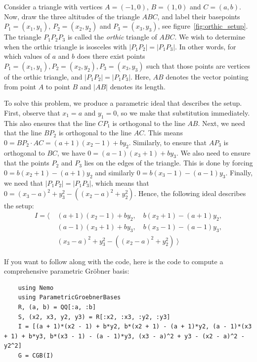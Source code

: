 \begin{example}\label{ex:quant_elim}\upshape
  Consider a triangle with vertices $A = (-1, 0)$, $B = (1, 0)$ and $C = (a, b)$. Now, draw the three altitudes of the triangle $ABC$, and label their basepoints $P_{1} = (x_{1}, y_{1})$, $P_{2} = (x_{2}, y_{2})$ and $P_{3} = (x_{3}, y_{3})$, see figure~\ref{fig:orthic_setup}. The triangle $P_{1}P_{2}P_{3}$ is called the \textit{orthic} triangle of $ABC$. We wish to determine when the orthic triangle is isosceles with $|P_{1}P_{2}| = |P_{1}P_{3}|$. In other words, for which values of $a$ and $b$ does there exist points $P_{1} = (x_{1}, y_{1}), P_{2} = (x_{2}, y_{2}), P_{3} = (x_{3}, y_{3})$ such that those points are vertices of the orthic triangle, and $|P_{1}P_{2}| = |P_{1}P_{3}|$. Here, $AB$ denotes the vector pointing from point $A$ to point $B$ and $|AB|$ denotes its length.

  To solve this problem, we produce a parametric ideal that describes the setup. First, observe that $x_{1} = a$ and $y_{1} = 0$, so we make that substitution immediately. This also ensures that the line $CP_{1}$ is orthogonal to the line $AB$. Next, we need that the line $BP_{2}$ is orthogonal to the line $AC$. This means $0 = BP_{2} \cdot AC = (a + 1)(x_{2} - 1) + b y_{2}$. Similarly, to ensure that $AP_{3}$ is orthogonal to $BC$, we have $0 = (a - 1)(x_{3} + 1) + b y_{3}$. We also need to ensure that the points $P_{2}$ and $P_{3}$ lies on the edges of the triangle. This is done by forcing $0 = b(x_{2} + 1) - (a + 1)y_{2}$ and similarly $0 = b(x_{3} - 1) - (a - 1)y_{3}$. Finally, we need that $|P_{1}P_{2}| = |P_{1}P_{3}|$, which means that $0 = {(x_{3} - a)}^{2} + y_{3}^{2} - ({(x_{2} - a)}^{2} + y_{2}^{2})$. Hence, the following ideal describes the setup:
  \begin{align*}
    I = \langle\; &(a + 1)(x_{2} - 1) + b y_{2}, \quad  b(x_{2} + 1) - (a + 1)y_{2}, \\
                  &(a - 1)(x_{3} + 1) + b y_{3}, \quad  b(x_{3} - 1) - (a - 1)y_{3}, \\
                  & {(x_{3} - a)}^{2} + y_{3}^{2} - ({(x_{2} - a)}^{2} + y_{2}^{2}) \; \rangle
  \end{align*}

  If you want to follow along with the code, here is the code to compute a comprehensive parametric Gröbner basis:
  \begin{verbatim}
    using Nemo
    using ParametricGroebnerBases
    R, (a, b) = QQ[:a, :b]
    S, (x2, x3, y2, y3) = R[:x2, :x3, :y2, :y3]
    I = [(a + 1)*(x2 - 1) + b*y2, b*(x2 + 1) - (a + 1)*y2, (a - 1)*(x3 + 1) + b*y3, b*(x3 - 1) - (a - 1)*y3, (x3 - a)^2 + y3 - (x2 - a)^2 - y2^2]
    G = CGB(I)
  \end{verbatim}


\end{example}
